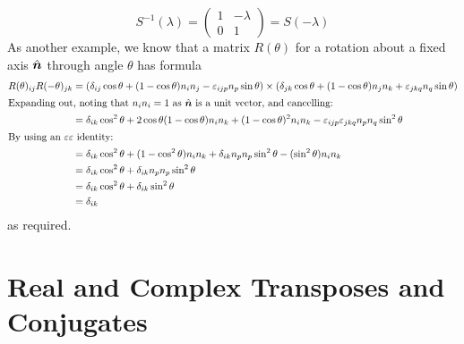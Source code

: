 \documentclass{article}
\begin{document}
	\[ S^{-1}(\lambda) = \begin{pmatrix}
		1 & -\lambda \\ 0 & 1
	\end{pmatrix} = S(-\lambda) \]
	As another example, we know that a matrix $R(\theta)$ for a rotation about a fixed axis $\hat{\bm n}$ through angle $\theta$ has formula
	\begin{align*}
		R(\theta)_{ij} R(-\theta)_{jk} &= (\delta_{ij}\cos \theta + (1 - \cos \theta) n_i n_j - \varepsilon_{ijp}n_p \sin \theta) \times (\delta_{jk}\cos \theta + (1 - \cos \theta) n_j n_k + \varepsilon_{jkq}n_q \sin \theta) \\
		\intertext{Expanding out, noting that $n_in_i = 1$ as $\hat{\bm n}$ is a unit vector, and cancelling:}
		&= \delta_{ik} \cos^2 \theta + 2\cos \theta(1 - \cos \theta) n_in_k + (1 - \cos \theta)^2n_in_k - \varepsilon_{ijp}\varepsilon_{jkq} n_p n_q \sin^2 \theta \\
		\intertext{By using an $\varepsilon\varepsilon$ identity:}
		&= \delta_{ik}\cos^2\theta + (1 - \cos^2 \theta)n_in_k + \delta_{ik}n_pn_p \sin^2 \theta - (\sin^2 \theta)n_in_k \\
		&= \delta_{ik}\cos^2\theta + \delta_{ik}n_pn_p \sin^2 \theta \\
		&= \delta_{ik}\cos^2\theta + \delta_{ik} \sin^2 \theta \\
		&= \delta_{ik}
	\end{align*}
	as required.

	\section{Real and Complex Transposes and Conjugates}
\end{document}
